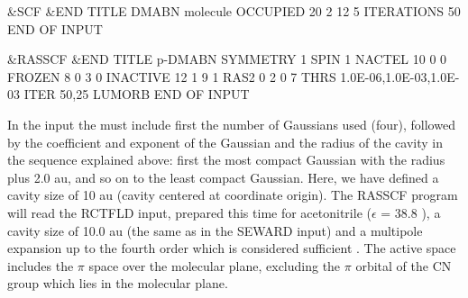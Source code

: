 \begin{inputlisting}
 &SCF &END                                                                      
TITLE                                                                           
 DMABN molecule                                                    
OCCUPIED                                                                        
20 2 12 5
ITERATIONS                                                                      
50                                                                              
END OF INPUT                                                                    

 &RASSCF &END                                                                   
TITLE                                                                           
 p-DMABN
SYMMETRY                                                                        
    1                                                                          
SPIN                                                                            
    1                                                                           
NACTEL                                                                          
   10    0    0                                                                 
FROZEN                                                                          
    8    0    3    0                                                            
INACTIVE                                                                        
   12    1    9    1                                                            
RAS2                                                                            
    0    2    0    7                                                            
THRS                                                                            
1.0E-06,1.0E-03,1.0E-03                                                        
ITER                                                                            
50,25                                                                           
LUMORB                                                                          
END OF INPUT                                                                    

\end{inputlisting}


In the  input the  must include
first the number of Gaussians used (four), followed by the
coefficient and exponent of the Gaussian and the radius of
the cavity in the sequence explained above: first the most
compact Gaussian with the radius plus 2.0 au, and so on
to the least compact Gaussian.
Here, we have defined a cavity size of 10 au
(cavity centered at coordinate origin). The RASSCF program will read
the RCTFLD input, prepared this time for acetonitrile
($\epsilon$ = 38.8 ), a cavity size of 10.0 au (the same
as in the SEWARD input) and a multipole expansion up to the fourth order
which is considered sufficient \cite{Serrano:97b}.
The active space includes the $\pi$ space over
the molecular plane, excluding the $\pi$ orbital of the CN
group which lies in the molecular plane.

